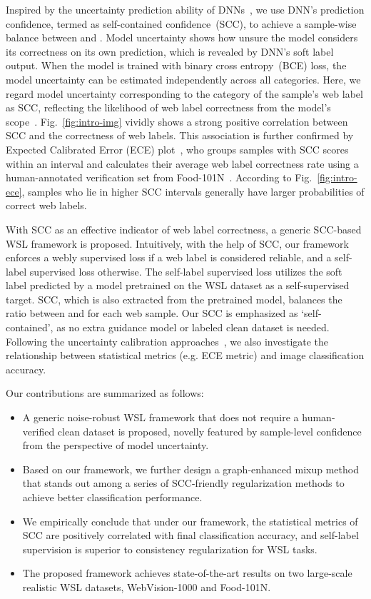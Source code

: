 \documentclass[runningheads]{llncs}
\begin{document}
Inspired by the uncertainty prediction ability of DNNs~\cite{gal2016uncertainty}, we use DNN's prediction confidence, termed as self-contained confidence~(SCC), to achieve a sample-wise balance between  and . 
Model uncertainty shows how unsure the model considers its correctness on its own prediction, which is revealed by DNN's soft label output. 
When the model is trained with binary cross entropy~(BCE) loss, the model uncertainty can be estimated independently across all categories.
Here, we regard model uncertainty corresponding to the category of the sample's web label as SCC, reflecting the likelihood of web label correctness from the model's scope~\cite{gal2016uncertainty}.
Fig.~\ref{fig:intro-img} vividly shows a strong positive correlation between SCC and the correctness of web labels. This association is further confirmed by Expected Calibrated Error (ECE) plot~\cite{guo2017calibration}, who groups samples with SCC scores within an interval and calculates their average web label correctness rate using a human-annotated verification set from Food-101N~\cite{lee2018cleannet}. According to Fig.~\ref{fig:intro-ece}, samples who lie in higher SCC intervals generally have larger probabilities of correct web labels.

With SCC as an effective indicator of web label correctness, a generic SCC-based WSL framework is proposed. Intuitively, with the help of SCC, our framework enforces a webly supervised loss  if a web label is considered reliable, and a self-label supervised loss  otherwise. The self-label supervised loss utilizes the soft label predicted by a model pretrained on the WSL dataset as a self-supervised target. SCC, which is also extracted from the pretrained model, balances the ratio between  and  for each web sample. Our SCC is emphasized as `self-contained', as no extra guidance model or labeled clean dataset is needed. 
Following the uncertainty calibration approaches~\cite{guo2017calibration,thulasidasan2019mixup}, we also investigate the relationship between statistical metrics (e.g. ECE metric) and image classification accuracy.

Our contributions are summarized as follows:
\begin{itemize}
	\item A generic noise-robust WSL framework that does not require a human-verified clean dataset is proposed, novelly featured by sample-level confidence from the perspective of model uncertainty.
	\item Based on our framework, we further design a graph-enhanced mixup method that stands out among a series of SCC-friendly regularization methods to achieve better classification performance.
    \item We empirically conclude that under our framework, the statistical metrics of SCC are positively correlated with final classification accuracy, and self-label supervision is superior to consistency regularization for WSL tasks.
	\item The proposed framework achieves state-of-the-art results on two large-scale realistic WSL datasets,  WebVision-1000 and Food-101N.
\end{itemize}
\end{document}
